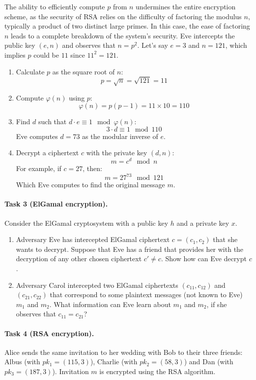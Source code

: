 \documentclass{article}
\begin{document}
The ability to efficiently compute \( p \) from \( n \) undermines the entire encryption scheme, as the security of RSA relies on the difficulty of factoring the modulus \( n \), typically a product of two distinct large primes. In this case, the ease of factoring \( n \) leads to a complete breakdown of the system's security.
Eve intercepts the public key \( (e, n) \) and observes that \( n = p^2 \). Let's say \( e = 3 \) and \( n = 121 \), which implies \( p \) could be \( 11 \) since \( 11^2 = 121 \).

\begin{enumerate}
    \item Calculate \( p \) as the square root of \( n \):
    \[ p = \sqrt{n} = \sqrt{121} = 11 \]
    \item Compute \( \varphi(n) \) using \( p \):
    \[ \varphi(n) = p(p - 1) = 11 \times 10 = 110 \]
    \item Find \( d \) such that \( d \cdot e \equiv 1 \mod \varphi(n) \):
    \[ 3 \cdot d \equiv 1 \mod 110 \]
    Eve computes \( d = 73 \) as the modular inverse of \( e \).
    \item Decrypt a ciphertext \( c \) with the private key \( (d, n) \):
    \[ m = c^d \mod n \]
    For example, if \( c = 27 \), then:
    \[ m = 27^{73} \mod 121 \]
    Which Eve computes to find the original message \( m \).
\end{enumerate}


\paragraph{Task 3 (ElGamal encryption).} Consider the ElGamal cryptosystem with a public key $h$ and a private key $x$.
\begin{enumerate}
    \item Adversary Eve has intercepted ElGamal ciphertext $c = (c_1,c_2)$ that she wants to decrypt. Suppose that Eve has a friend that provides her with the decryption of any other chosen ciphertext $c' \neq c $. Show how can Eve decrypt $c$.
    \item Adversary Carol intercepted two ElGamal ciphertexts $(c_{11} , c_{12})$ and $(c_{21} , c_{22})$ that correspond to some plaintext messages (not known to Eve) $m_1$ and $m_2$. What information can Eve learn about $m_1$ and $m_2$, if she observes that $c_{11} = c_{21}$?
\end{enumerate}

\paragraph{Task 4 (RSA encryption).} Alice sends the same invitation to her wedding with Bob to their three friends: Albus (with $pk_1=(115,3)$), Charlie (with $pk_2=(58,3)$) and Dan (with $pk_3=(187,3)$). Invitation $m$ is encrypted using the RSA algorithm. \\
\end{document}
